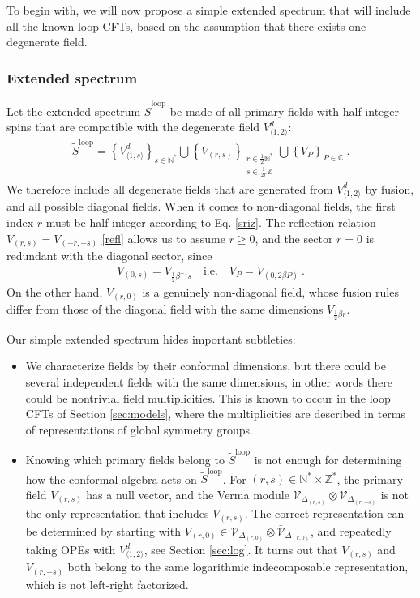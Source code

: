 \documentclass[12pt, a4paper]{article}
\theoremstyle{break}
\begin{document}
To begin with, we will now propose a simple extended spectrum that will include all the known loop CFTs, based on the assumption that there exists one degenerate field. 

\subsubsection{Extended spectrum}

Let the extended spectrum $\widetilde{S}^\text{loop}$ be made of all primary fields with half-integer spins that are compatible with the degenerate field $V^d_{\langle 1,2\rangle}$:
\begin{align}
 \boxed{\widetilde{S}^\text{loop} = \left\{V^d_{\langle 1,s\rangle}\right\}_{s\in\mathbb{N}^*}  \bigcup \left\{V_{(r,s)}\right\}_{\substack{r\in \frac12\mathbb{N}^*\\ s\in\frac{1}{2r}\mathbb{Z}}}\bigcup \left\{ V_P\right\}_{P\in\mathbb{C}} } \ .
 \label{sloop}
\end{align}
We therefore include all degenerate fields that are generated from $V^d_{\langle 1,2\rangle}$ by fusion, and all possible diagonal fields. When it comes to non-diagonal fields, the first index $r$ must be half-integer according to Eq. \eqref{sriz}. The reflection relation $V_{(r,s)}=V_{(-r,-s)}$ \eqref{refl} allows us to assume $r\geq 0$, and the sector $r=0$ is redundant with the diagonal sector, since 
\begin{align}
 V_{(0,s)} = V_{\frac12\beta^{-1}s}  \quad \text{i.e.} \quad V_P = V_{(0,2\beta P)} \ .
 \label{sP}
\end{align}
On the other hand, $V_{(r,0)}$ is a genuinely non-diagonal field, whose fusion rules differ from those of the diagonal field with the same dimensions $V_{\frac12\beta r}$. 

Our simple extended spectrum hides important subtleties: 
\begin{itemize}
 \item We characterize fields by their conformal dimensions, but there could be several independent fields with the same dimensions, in other words there could be nontrivial field multiplicities. This is known to occur in the loop CFTs of Section \ref{sec:models}, where the multiplicities are described in terms of representations of global symmetry groups.  
 \item Knowing which primary fields belong to $\widetilde{S}^\text{loop}$ is not enough for determining how the conformal algebra acts on $\widetilde{S}^\text{loop}$. For $(r,s)\in \mathbb{N}^*\times \mathbb{Z}^*$, the primary field $V_{(r,s)}$ has a null vector, and the Verma module $\mathcal{V}_{\Delta_{(r,s)}}\otimes\bar{\mathcal{V}}_{\Delta_{(r,-s)}}$ is not the only representation that includes $V_{(r,s)}$. The correct representation can be determined by starting with $V_{(r,0)}\in \mathcal{V}_{\Delta_{(r,0)}}\otimes\bar{\mathcal{V}}_{\Delta_{(r,0)}}$, and repeatedly taking OPEs with $V^d_{\langle 1,2\rangle}$, see Section \ref{sec:log}. It turns out that $V_{(r,s)}$ and $V_{(r,-s)}$ both belong to the same logarithmic indecomposable representation, which is not left-right factorized. 
\end{itemize}
\end{document}
